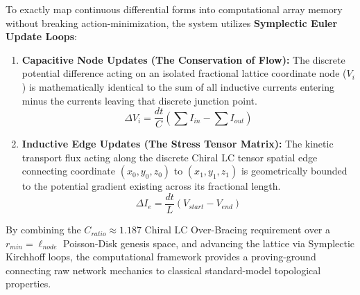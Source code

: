 To exactly map continuous differential forms into computational array memory without breaking action-minimization, the system utilizes \textbf{Symplectic Euler Update Loops}:
\begin{enumerate}
    \item \textbf{Capacitive Node Updates (The Conservation of Flow):} The discrete potential difference acting on an isolated fractional lattice coordinate node ($V_i$) is mathematically identical to the sum of all inductive currents entering minus the currents leaving that discrete junction point. 
    \[ \Delta V_i = \frac{dt}{C} \left( \sum I_{in} - \sum I_{out} \right) \]
    \item \textbf{Inductive Edge Updates (The Stress Tensor Matrix):} The kinetic transport flux acting along the discrete Chiral LC tensor spatial edge connecting coordinate $(x_0, y_0, z_0)$ to $(x_1, y_1, z_1)$ is geometrically bounded to the potential gradient existing across its fractional length. 
    \[ \Delta I_e = \frac{dt}{L} \left( V_{start} - V_{end} \right) \] 
\end{enumerate}

By combining the $C_{ratio} \approx 1.187$ Chiral LC Over-Bracing requirement over a $r_{min} = \ell_{node}$ Poisson-Disk genesis space, and advancing the lattice via Symplectic Kirchhoff loops, the computational framework provides a proving-ground connecting raw network mechanics to classical standard-model topological properties.
